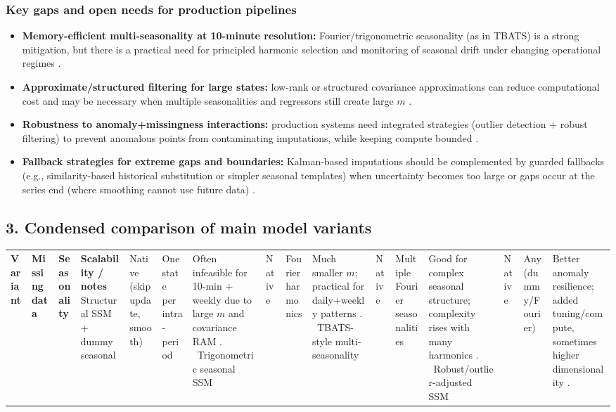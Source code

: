 \subsubsection*{Key gaps and open needs for production pipelines}
\begin{itemize}
\item \textbf{Memory-efficient multi-seasonality at 10-minute resolution:} Fourier/trigonometric seasonality (as in TBATS) is a strong mitigation, but there is a practical need for principled harmonic selection and monitoring of seasonal drift under changing operational regimes \cite{delivera2011}.
\item \textbf{Approximate/structured filtering for large states:} low-rank or structured covariance approximations can reduce computational cost and may be necessary when multiple seasonalities and regressors still create large $m$ \cite{pnevmatikakis2014}.
\item \textbf{Robustness to anomaly+missingness interactions:} production systems need integrated strategies (outlier detection + robust filtering) to prevent anomalous points from contaminating imputations, while keeping compute bounded \cite{shankar2023}.
\item \textbf{Fallback strategies for extreme gaps and boundaries:} Kalman-based imputations should be complemented by guarded fallbacks (e.g., similarity-based historical substitution or simpler seasonal templates) when uncertainty becomes too large or gaps occur at the series end (where smoothing cannot use future data) \cite{durbin2012}.
\end{itemize}

\subsection*{3. Condensed comparison of main model variants}
\begin{table}[h]
\centering
\small
\begin{tabular}{p{3.1cm}p{2.7cm}p{2.8cm}p{4.2cm}}
\hline
\textbf{Variant} & \textbf{Missing data} & \textbf{Seasonality} & \textbf{Scalability / notes} \
\hline
Structural SSM + dummy seasonal & Native (skip update, smooth) \cite{durbin2012} & One state per intra-period & Often infeasible for 10-min + weekly due to large $m$ and covariance RAM \cite{durbin2012}. \
Trigonometric seasonal SSM & Native \cite{durbin2012} & Fourier harmonics & Much smaller $m$; practical for daily+weekly patterns \cite{delivera2011}. \
TBATS-style multi-seasonality & Native \cite{delivera2011} & Multiple Fourier seasonalities & Good for complex seasonal structure; complexity rises with many harmonics \cite{delivera2011}. \
Robust/outlier-adjusted SSM & Native \cite{shankar2023} & Any (dummy/Fourier) & Better anomaly resilience; added tuning/compute, sometimes higher dimensionality \cite{shankar2023}. \
\hline
\end{tabular}
\end{table}

